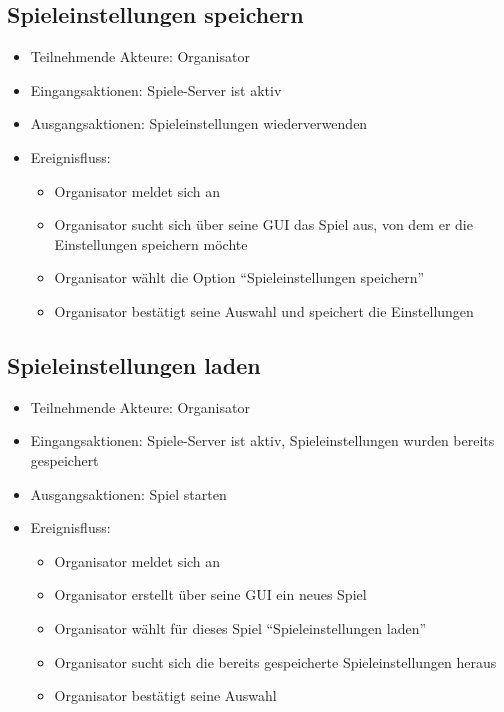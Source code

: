 \documentclass[a4paper]{scrreprt}
\begin{document}
    \subsection{Spieleinstellungen speichern}
    \begin{itemize}
        \item Teilnehmende Akteure: \Gls{Organisator}
        \item Eingangsaktionen: Spiele-Server ist aktiv
        \item Ausgangsaktionen: Spieleinstellungen wiederverwenden
        \item Ereignisfluss:
        \begin{itemize}
            \item Organisator meldet sich an
            \item Organisator sucht sich über seine GUI das Spiel aus, von dem er die Einstellungen speichern möchte
            \item Organisator wählt die Option \enquote{Spieleinstellungen speichern}
            \item Organisator bestätigt seine Auswahl und speichert die Einstellungen
        \end{itemize}
    \end{itemize}

    \subsection{Spieleinstellungen laden}
    \begin{itemize}
        \item Teilnehmende Akteure: \Gls{Organisator}
        \item Eingangsaktionen: Spiele-Server ist aktiv, Spieleinstellungen wurden bereits gespeichert
        \item Ausgangsaktionen: Spiel starten
        \item Ereignisfluss:
        \begin{itemize}
            \item Organisator meldet sich an
            \item Organisator erstellt über seine GUI ein neues Spiel
            \item Organisator wählt für dieses Spiel \enquote{Spieleinstellungen laden}
            \item Organisator sucht sich die bereits gespeicherte Spieleinstellungen heraus
            \item Organisator bestätigt seine Auswahl
        \end{itemize}
    \end{itemize}
\end{document}
